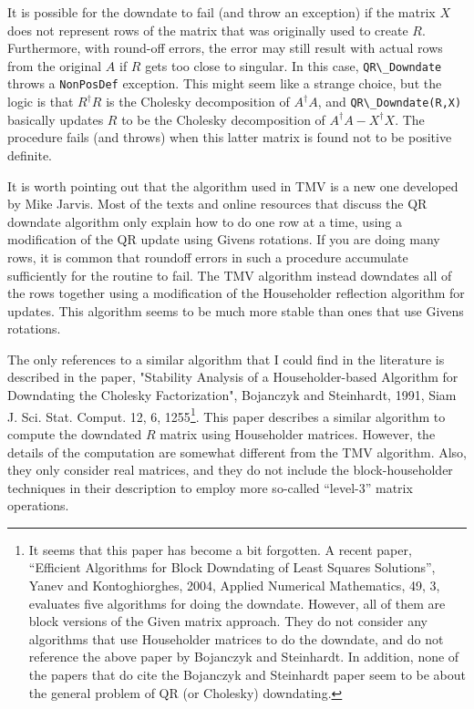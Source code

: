 \documentclass[twoside,letterpaper,11pt]{article}
\renewcommand{\tt}[1]{{\lstinline {#1}}}
\begin{document}
It is possible for the downdate to fail (and throw an exception) 
if the matrix $X$ does not represent rows
of the matrix that was originally used to create $R$.
Furthermore,
with round-off errors, the error may still result with actual rows from the 
original $A$
if $R$ gets too close to singular.  In this case, \tt{QR\_Downdate} throws
a \tt{NonPosDef} exception.  This might seem like a strange choice, but the 
logic is that $R^\dagger R$ is the Cholesky decomposition of $A^\dagger A$,
and \tt{QR\_Downdate(R,X)} basically updates $R$ to be the Cholesky decomposition
of $A^\dagger A - X^\dagger X$.  The procedure fails (and throws) when this latter 
matrix is found not to be positive definite.

It is worth pointing out that the algorithm used in TMV is a new one developed by
Mike Jarvis.  Most of the texts and online resources that discuss the 
QR downdate algorithm only explain how to do one row at a time, using a 
modification of the QR update using Givens rotations.  
If you are doing many rows, it is common that roundoff errors in such a 
procedure accumulate sufficiently for the routine to fail.  The TMV algorithm
instead downdates all of the rows together using a modification of the 
Householder reflection algorithm for updates.  This algorithm seems to be
much more stable than ones that use Givens rotations.  

The only references to a similar algorithm that I could find in the literature is 
described in the paper,
"Stability Analysis of a Householder-based Algorithm for Downdating the Cholesky Factorization", Bojanczyk and Steinhardt, 1991, Siam J. Sci. Stat. Comput. 12, 6, 
1255\footnote{
It seems that this paper has become a bit forgotten.  A recent paper,
``Efficient Algorithms for Block Downdating of Least Squares Solutions'', Yanev and Kontoghiorghes, 2004, Applied Numerical Mathematics, 49, 3, evaluates
five algorithms for doing the downdate.  However, all
of them are block versions of the Given matrix approach.  They do not consider 
any algorithms that use Householder matrices to do the downdate, and do not reference
the above paper by Bojanczyk and Steinhardt.  In addition, none of the papers that
do cite the Bojanczyk and Steinhardt paper seem to be about the general problem 
of QR (or Cholesky) downdating.
}.
This paper describes a similar algorithm to compute the downdated $R$ matrix
using Householder matrices.  However, the details of the computation are somewhat
different from the TMV algorithm.  Also, they only consider real matrices, and they 
do not include the block-householder techniques in their description to employ more
so-called ``level-3'' matrix operations.
\end{document}
